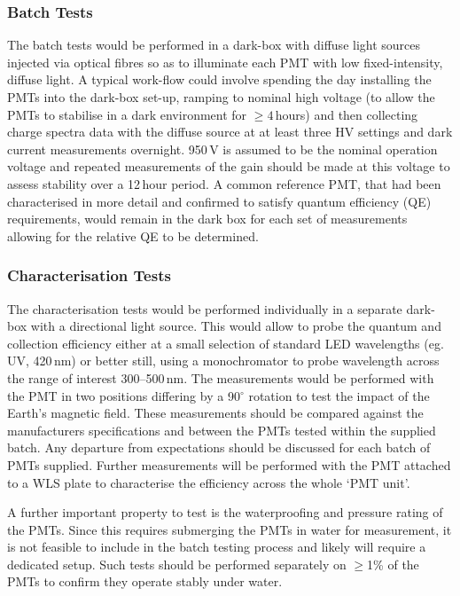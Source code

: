 \documentclass[12pt,a4paper]{article}
\begin{document}
\subsubsection{Batch Tests}
The batch tests would be performed in a dark-box with diffuse light sources injected via optical fibres so as to illuminate each PMT with low fixed-intensity, diffuse light. A typical work-flow could involve spending the day installing the PMTs into the dark-box set-up, ramping to nominal high voltage (to allow the PMTs to stabilise in a dark environment for $\ge4$\,hours) and then collecting charge spectra data with the diffuse source at at least three HV settings and dark current measurements overnight. 950\,V is assumed to be the nominal operation voltage and repeated measurements of the gain should be made at this voltage to assess stability over a 12\,hour period. A common reference PMT, that had been characterised in more detail and confirmed to satisfy quantum efficiency (QE) requirements, would remain in the dark box for each set of measurements allowing for the relative QE to be determined. 

\subsubsection{Characterisation Tests}
The characterisation tests would be performed individually in a separate dark-box with a directional light source. This would allow to probe the quantum and collection efficiency either at a small selection of standard LED wavelengths (eg. UV, 420\,nm) or better still, using a monochromator to probe wavelength across the range of interest 300--500\,nm. The measurements would be performed with the PMT in two positions differing by a 90$^\circ$ rotation to test the impact of the Earth's magnetic field. These measurements should be compared against the manufacturers specifications and between the PMTs tested within the supplied batch. Any departure from expectations should be discussed for each batch of PMTs supplied. Further measurements will be performed with the PMT attached to a WLS plate to characterise the efficiency across the whole `PMT unit'. 

A further important property to test is the waterproofing and pressure rating of the PMTs. Since this requires submerging the PMTs in water for measurement, it is not feasible to include in the batch testing process and likely will require a dedicated setup. Such tests should be performed separately on $\ge$1\% of the PMTs to confirm they operate stably under water.
\end{document}
